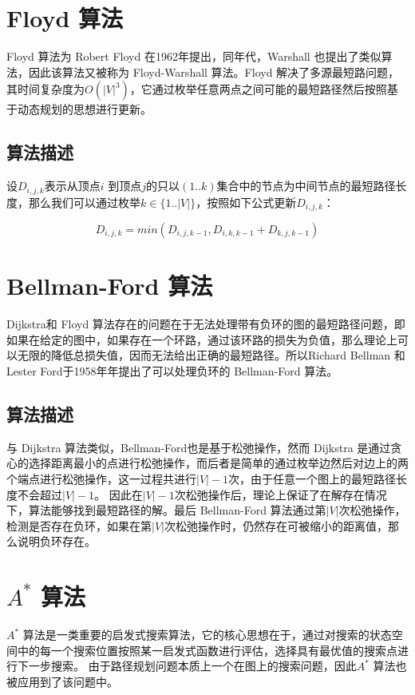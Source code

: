\documentclass{standalone}
\begin{document}
\section{Floyd 算法}
Floyd 算法为 Robert Floyd 在1962年提出，同年代，Warshall 也提出了类似算法，因此该算法又被称为 Floyd-Warshall 算法。Floyd 解决了多源最短路问题，其时间复杂度为$O(|V|^3)$，它通过枚举任意两点之间可能的最短路径然后按照基于动态规划的思想进行更新。
\subsection{算法描述}
设$D_{i,j,k}$表示从顶点$i$ 到顶点$j$的只以$(1..k)$集合中的节点为中间节点的最短路径长度，那么我们可以通过枚举$k \in \{1..|V|\}$，按照如下公式更新$D_{i,j,k}$：
\begin{center}
    \begin{equation}
    D_{i,j,k} = min(D_{i,j,k-1}, D_{i,k,k-1} + D_{k,j,k-1})
\end{equation}
\end{center}
\section{Bellman-Ford 算法}
Dijkstra和 Floyd 算法存在的问题在于无法处理带有负环的图的最短路径问题，即如果在给定的图中，如果存在一个环路，通过该环路的损失为负值，那么理论上可以无限的降低总损失值，因而无法给出正确的最短路径。所以Richard Bellman 和 Lester Ford于1958年年提出了可以处理负环的 Bellman-Ford 算法。
\subsection{算法描述}
与 Dijkstra 算法类似，Bellman-Ford也是基于松弛操作，然而 Dijkstra 是通过贪心的选择距离最小的点进行松弛操作，而后者是简单的通过枚举边然后对边上的两个端点进行松弛操作，这一过程共进行$|V|-1$次，由于任意一个图上的最短路径长度不会超过$|V|-1$。
因此在$|V|-1$次松弛操作后，理论上保证了在解存在情况下，算法能够找到最短路径的解。最后 Bellman-Ford 算法通过第$|V|$次松弛操作，检测是否存在负环，如果在第$|V|$次松弛操作时，仍然存在可被缩小的距离值，那么说明负环存在。
\section{$A^{*}$ 算法}
$A^{*}$ 算法是一类重要的启发式搜索算法，它的核心思想在于，通过对搜索的状态空间中的每一个搜索位置按照某一启发式函数进行评估，选择具有最优值的搜索点进行下一步搜索。
由于路径规划问题本质上一个在图上的搜索问题，因此$A^{*}$ 算法也被应用到了该问题中。
\end{document}
